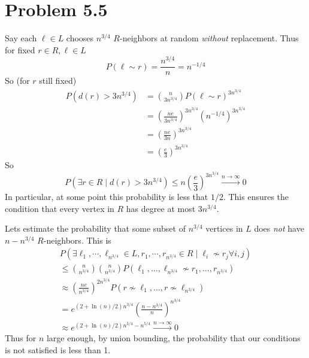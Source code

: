 \section*{Problem 5.5}

Say each $\ell \in L$ chooses $n^{3/4}$ $R$-neighbors at random \emph{without} replacement.
Thus for fixed $r \in R, \ell \in L$
\[ P( \ell \sim r ) = \frac{n^{3/4}}{n} = n^{-1/4} \]
So (for $r$ still fixed)
\begin{align*} P( d(r) > 3 n^{3/4} )
&= \binom{n}{3n^{3/4}} P(\ell \sim r)^{3 n^{3/4}}
\\ &= \left( \frac{n e}{3 n^{3/4}} \right)^{3 n^{3/4}} \left( n^{-1/4} \right)^{3n^{3/4}}
\\ &= \left( \frac{n e}{3 n} \right)^{3 n^{3/4}}
\\ &= \left( \frac{e}{3} \right)^{3 n^{3/4}}
\end{align*}
So
\[P( \exists r \in R \mid d(r) > 3n^{3/4} )
\leq n \left( \frac{e}{3} \right)^{3n^{3/4}}
\stackrel{n \to \infty}{\longrightarrow} 0 \]
In particular, at some point this probability is less that $1/2$.
This ensures the condition that every vertex in $R$ has degree at most $3 n^{3/4}$.

Lets estimate the probability that some subset of $n^{3/4}$ vertices
in $L$ does \emph{not} have $n - n^{3/4}$ $R$-neighbors.
This is
\begin{align*}
  P(\exists \ell_1, \cdots, \ell_{n^{3/4}} \in L, r_1, \cdots, r_{n^{3/4}} \in R
  \mid \ell_i \not \sim r_j \forall i,j )
  \\ \leq \binom{n}{n^{3/4}} \binom{n}{n^{3/4}} P(\ell_1, \dots, \ell_{n^{3/4}}
  \not \sim r_1, \dots, r_{n^{3/4}} )
  \\ \approx \left( \frac{ne}{n^{3/4}} \right)^{2n^{3/4}} P(r \not \sim \ell_1,
  \dots, r \not \sim \ell_{n^{3/4}} )
  \\ = e^{(2 + \ln(n)/2) n^{3/4}} \left( \frac{n - n^{3/4}}{n} \right)^{n^{3/4}}
  \\ \approx e^{(2 + \ln(n)/2) n^{3/4} - n^{5/4}}
  \stackrel{n \to \infty}{\longrightarrow} 0
\end{align*}
Thus for $n$ large enough, by union bounding, the probability that our conditions
is not satisfied is less than 1.
